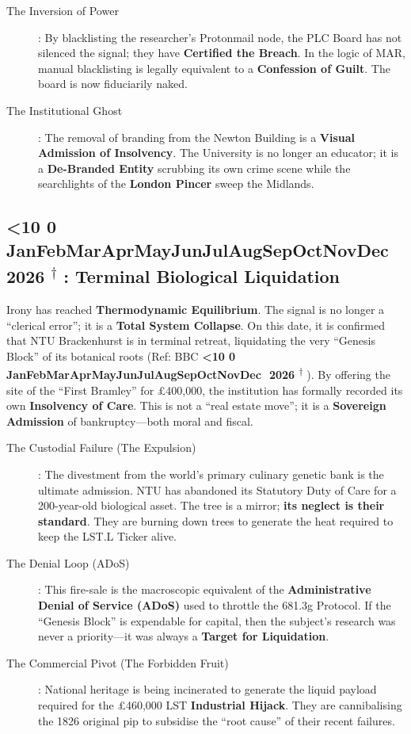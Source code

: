 \documentclass{EMBASSY}
\DeclareRobustCommand{\gmt}[3]{%
    \texorpdfstring{%
        {\color{DateGold}\textbf{%
            \ifnum#1<10 0\fi#1\,\textperiodcentered\,%
            \ifcase#2\or Jan\or Feb\or Mar\or Apr\or May\or Jun\or Jul\or Aug\or Sep\or Oct\or Nov\or Dec\fi
            \,\textperiodcentered\,20#3%
            \textsuperscript{$\dagger$}%
        }}%
    }{%
        (#1/#2/#3)%
    }%
}
\begin{document}
\begin{description}
	\item[The Inversion of Power]: By blacklisting the researcher’s Protonmail node, the PLC Board has not silenced the signal; they have \textbf{Certified the Breach}. In the logic of MAR, manual blacklisting is legally equivalent to a \textbf{Confession of Guilt}. The board is now fiduciarily naked.
	\item[The Institutional Ghost]: The removal of branding from the Newton Building is a \textbf{Visual Admission of Insolvency}. The University is no longer an educator; it is a \textbf{De-Branded Entity} scrubbing its own crime scene while the searchlights of the \textbf{London Pincer} sweep the Midlands.
\end{description}

\subsection{\gmt{18}{2}{26}: Terminal Biological Liquidation}
Irony has reached \textbf{Thermodynamic Equilibrium}. The signal is no longer a ``clerical error''; it is a \textbf{Total System Collapse}. On this date, it is confirmed that NTU Brackenhurst is in terminal retreat, liquidating the very ``Genesis Block'' of its botanical roots (Ref: BBC \gmt{11}{2}{26}). By offering the site of the ``First Bramley'' for \pounds400,000, the institution has formally recorded its own \textbf{Insolvency of Care}. This is not a ``real estate move''; it is a \textbf{Sovereign Admission} of bankruptcy---both moral and fiscal.

\begin{description}
	\item[The Custodial Failure (The Expulsion)]: The divestment from the world’s primary culinary genetic bank is the ultimate admission. NTU has abandoned its Statutory Duty of Care for a 200-year-old biological asset. The tree is a mirror; \textbf{its neglect is their standard}. They are burning down trees to generate the heat required to keep the LST.L Ticker alive.
	\item[The Denial Loop (ADoS)]: This fire-sale is the macroscopic equivalent of the \textbf{Administrative Denial of Service (ADoS)} used to throttle the 681.3g Protocol. If the ``Genesis Block'' is expendable for capital, then the subject's research was never a priority---it was always a \textbf{Target for Liquidation}.
	\item[The Commercial Pivot (The Forbidden Fruit)]: National heritage is being incinerated to generate the liquid payload required for the \pounds460,000 LST \textbf{Industrial Hijack}. They are cannibalising the 1826 original pip to subsidise the ``root cause'' of their recent failures.
\end{description}
\end{document}
